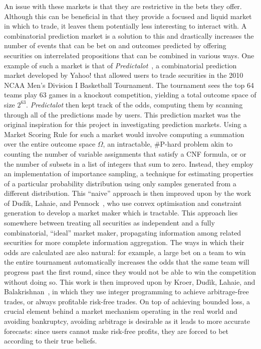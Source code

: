 An issue with these markets is that they are restrictive in the bets they
offer. Although this can be beneficial in that they provide a focused and
liquid market in which to trade, it leaves them potentially less interesting to
interact with. A combinatorial prediction market is a solution to this and
drastically increases the number of events that can be bet on and outcomes
predicted by offering securities on interrelated propositions that can be
combined in various ways. One example of such a market is that of
\emph{Predictalot}~\cite{Predictalot}, a combinatorial prediction market
developed by Yahoo! that allowed users to trade securities in the 2010 NCAA
Men's Division I Basketball Tournament. The tournament sees the top 64 teams
play 63 games in a knockout competition, yielding a total outcome space of size
$2^{63}$. \emph{Predictalot} then kept track of the odds, computing them by
scanning through all of the predictions made by users. This prediction market
was the original inspiration for this project in investigating prediction
markets. Using a Market Scoring Rule for such a market would involve computing
a summation over the entire outcome space $\Omega$, an intractable, \#P-hard
problem akin to counting the number of variable assignments that satisfy a CNF
formula, or or the number of subsets in a list of integers that sum to zero.
Instead, they employ an implementation of importance sampling, a technique for
estimating properties of a particular probability distribution using only
samples generated from a different distribution. This ``naive'' approach is
then improved upon by the work of Dud\`ik, Lahaie, and
Pennock~\cite{Dudik2012}, who use convex optimisation and constraint generation
to develop a market maker which is tractable. This approach lies somewhere
between treating all securities as independent and a fully combinatorial,
``ideal'' market maker, propagating information among related securities for
more complete information aggregation. The ways in which their odds are
calculated are also natural: for example, a large bet on a team to win the
entire tournament automatically increases the odds that the same team will
progress past the first round, since they would not be able to win the
competition without doing so. This work is then improved upon by Kroer,
Dud\`ik, Lahaie, and Balakrishnan~\cite{Kroer2016}, in which they use integer
programming to achieve arbitrage-free trades, or always profitable risk-free
trades. On top of achieving bounded loss, a crucial element behind a market
mechanism operating in the real world and avoiding bankruptcy, avoiding
arbitrage is desirable as it leads to more accurate forecasts: since users
cannot make risk-free profits, they are forced to bet according to their true
beliefs.

